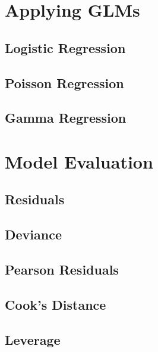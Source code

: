\documentclass[12pt,a4paper]{report}
\begin{document}
\part{Applying GLMs}

\chapter{Logistic Regression}

\chapter{Poisson Regression}

\chapter{Gamma Regression}

\part{Model Evaluation}

\chapter*{Residuals}

\chapter*{Deviance}

\chapter*{Pearson Residuals}

\chapter*{Cook's Distance}

\chapter*{Leverage}
\end{document}
